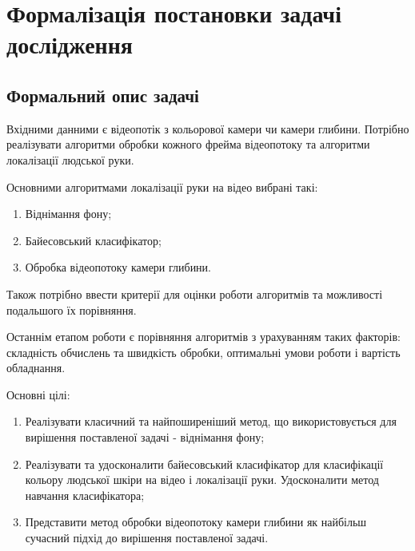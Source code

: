 \section{Формалізація постановки задачі дослідження}
\jointitles
\subsection{Формальний опис задачі}

Вхідними данними є відеопотік з кольорової камери чи камери глибини. Потрібно реалізувати алгоритми обробки кожного фрейма відеопотоку та алгоритми локалізації людської руки.

Основними алгоритмами локалізації руки на відео вибрані такі:
\begin{enumerate}
	\item Віднімання фону;
	\item Байесовський класифікатор;
	\item Обробка відеопотоку камери глибини.
\end{enumerate}

Також потрібно ввести критерії для оцінки роботи алгоритмів та можливості подальшого їх порівняння.

Останнім етапом роботи є порівняння алгоритмів з урахуванням таких факторів: складність обчислень та швидкість обробки, оптимальні умови роботи і вартість обладнання.

Основні цілі:
\begin{enumerate}
	\item Реалізувати класичний та найпоширеніший метод, що використовується для вирішення поставленої задачі - віднімання фону;
	\item Реалізувати та удосконалити байесовський класифікатор для класифікації кольору людської шкіри на відео і локалізації руки. Удосконалити метод навчання класифікатора;
	\item Представити метод обробки відеопотоку камери глибини як найбільш сучасний підхід до вирішення поставленої задачі.
\end{enumerate}
